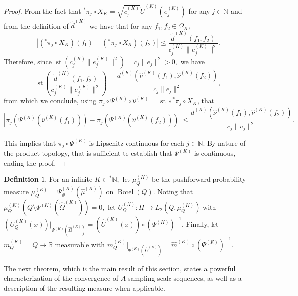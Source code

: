 \documentclass{amsart}
\theoremstyle{definition}
\newtheorem{definition}[thm]{Definition}
\theoremstyle{remark}
\def \St{\operatorname{st}}
\def \Borel{\operatorname{Borel}}
\def \HOM{\hat{\Omega}}
\def \HMU{\hat{\mu}}
\def \HNU{\hat{\nu}}
\def \HU{\hat{U}}
\def \Hm{\hat{m}}
\begin{document}
\begin{proof}
	From the fact that ${}^*\pi_j\circ X_K=\sqrt{c_j^{(K)}}\tilde{U}^{(K)}(e_j^{(K)})$ for any $j\in\mathbb{N}$ and from the definition of $\tilde{d}^{(K)}$ we have that for any $f_1,f_2\in\Omega_K,$ $$\left|({}^*\pi_j\circ X_K)(f_1)-({}^*\pi_j\circ X_K)(f_2) \right|\leq\frac{\tilde{d}^{(K)}(f_1,f_2)}{c_j^{(K)}\|e_j^{(K)}\|^2}.$$ Therefore, since $\St(c_j^{(K)}\|e_j^{(K)}\|^2)=c_j\|e_j\|^2>0,$ we have $$ \St\left(\frac{\tilde{d}^{(K)}(f_1,f_2)}{c_j^{(K)}\|e_j^{(K)}\|^2}\right)=\frac{d^{(K)}(\HNU^{(K)}(f_1),\HNU^{(K)}(f_2))}{c_j\|e_j\|^2},$$ from which we conclude, using $\pi_j\circ\Psi^{(K)}\circ\HNU^{(K)}=\St\circ{}^*\pi_j\circ X_K$, that $$\left|\pi_j(\Psi^{(K)}(\HNU^{(K)}(f_1)))-\pi_j(\Psi^{(K)}(\HNU^{(K)}(f_2)))\right|\leq\frac{d^{(K)}(\HNU^{(K)}(f_1),\HNU^{(K)}(f_2))}{c_j\|e_j\|^2}.$$ 
	
	This implies that $\pi_j\circ \Psi^{(K)}$ is Lipschitz continuous for each $j\in\mathbb{N}$. By nature of the product topology, that is sufficient to establish that $\Psi^{(K)}$ is continuous, ending the proof.
\end{proof}

\begin{definition}
	For an infinite $K\in{}^*\mathbb{N},$ let $\mu_Q^{(K)}$ be the pushforward probability measure $\mu_Q^{(K)}=\Psi^{(K)}_{\#}(\HMU^{(K)})$ on $\Borel(Q).$ Noting that $\mu_Q^{(K)}(Q\setminus\Psi^{(K)}(\HOM^{(K)}))=0,$ let $U_Q^{(K)}:H\rightarrow L_2(Q,\mu_Q^{(K)})$ with $(U_Q^{(K)}(x))|_{\Psi^{(K)}(\HOM^{(K)})}=(\HU^{(K)}(x))\circ (\Psi^{(K)})^{-1}.$ Finally, let $m_Q^{(K)}=Q\rightarrow\mathbb{R}$ measurable with $m_Q^{(K)}|_{\Psi^{(K)}(\HOM^{(K)})}=\Hm^{(K)}\circ (\Psi^{(K)})^{-1}$.
\end{definition}

The next theorem, which is the main result of this section, states a powerful characterization of the convergence of $A$-sampling-scale sequences, as well as a description of the resulting measure when applicable.
\end{document}
